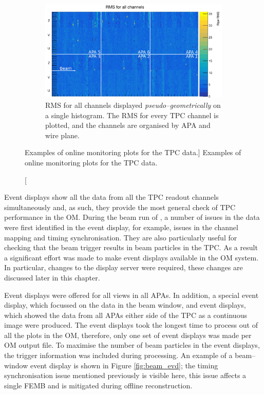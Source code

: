 \begin{figure}
	\begin{subfigure}[b]{0.75\textwidth}
		\centering
		\vspace{3mm}
		\includegraphics[width=\textwidth]{figures/all_chan_rms.png}
		\caption {RMS for all channels displayed \emph{pseudo--geometrically} on a 
		single histogram. The RMS for every TPC channel is plotted, and the channels 
		are organised by APA and wire plane.} 
		\label{fig:ped_noise}
	\end{subfigure}

	\caption
	[Examples of online monitoring plots for the TPC data.]
	{Examples of online monitoring plots for the TPC data.}
	\label{fig:tpc_om}

\end{figure}

Event displays show all the data from all the TPC readout channels
simultaneously and, as such, they provide the most general check of TPC 
performance in the OM. During the beam run of \protodune{}, a number of issues 
in the data were first identified in the event display, for example, issues in 
the channel mapping and timing synchronisation. They are also particularly 
useful for checking that the beam trigger results in beam particles in the 
TPC. As a result a significant effort was made to make event displays 
available in the \protodune{} OM system. In particular, changes to the display 
server were required, these changes are discussed later in this chapter. 

Event displays were offered for all views in all APAs. In addition, a special 
event display, which focussed on the data in the beam window, and event 
displays, which showed the data from all APAs either side of the TPC as a 
continuous image were produced. The event displays took the longest time to 
process out of all the plots in the OM, therefore, only one set of event 
displays was made per OM output file. To maximise the number of beam particles 
in the event displays, the trigger information was included during 
processing.  An example of a beam--window event display is shown in Figure 
\ref{fig:beam_evd}; the timing synchronisation issue mentioned previously is 
visible here, this issue affects a single FEMB and is mitigated during offline 
reconstruction.  

